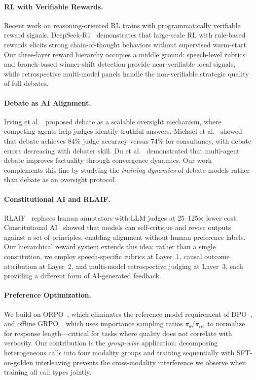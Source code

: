 \paragraph{RL with Verifiable Rewards.}
Recent work on reasoning-oriented RL trains with programmatically verifiable
reward signals. DeepSeek-R1~\cite{guo2025deepseekr1} demonstrates that
large-scale RL with rule-based rewards elicits strong chain-of-thought
behaviors without supervised warm-start. Our three-layer reward hierarchy
occupies a middle ground: speech-level rubrics and branch-based winner-shift
detection provide near-verifiable local signals, while retrospective
multi-model panels handle the non-verifiable strategic quality of full
debates.

\paragraph{Debate as AI Alignment.}
Irving et al.~\cite{irving2018debate} proposed debate as a scalable oversight
mechanism, where competing agents help judges identify truthful answers.
Michael et al.~\cite{michael2023debate} showed that debate achieves 84\%
judge accuracy versus 74\% for consultancy, with debate errors decreasing
with debater skill. Du et al.~\cite{du2024multiagent} demonstrated that
multi-agent debate improves factuality through convergence dynamics. Our
work complements this line by studying the \emph{training dynamics} of
debate models rather than debate as an oversight protocol.

\paragraph{Constitutional AI and RLAIF.}
RLAIF~\cite{lee2024rlaif} replaces human annotators with LLM judges at
25--125$\times$ lower cost. Constitutional AI~\cite{bai2022constitutional}
showed that models can self-critique and revise outputs against a set of
principles, enabling alignment without human preference labels. Our
hierarchical reward system extends this idea: rather than a single
constitution, we employ speech-specific rubrics at Layer~1, causal outcome
attribution at Layer~2, and multi-model retrospective judging at Layer~3,
each providing a different form of AI-generated feedback.

\paragraph{Preference Optimization.}
We build on ORPO~\cite{hong2024orpo}, which eliminates
the reference model requirement of DPO~\cite{rafailov2023dpo}, and
offline GRPO~\cite{shao2024deepseekmath}, which uses importance sampling
ratios $\pi_\theta / \pi_{\text{ref}}$ to normalize for response
length---critical for tasks where quality does not correlate with verbosity.
Our contribution is the \emph{group-wise} application: decomposing
heterogeneous calls into four modality groups and training sequentially
with SFT-on-golden interleaving prevents the cross-modality interference
we observe when training all call types jointly.

